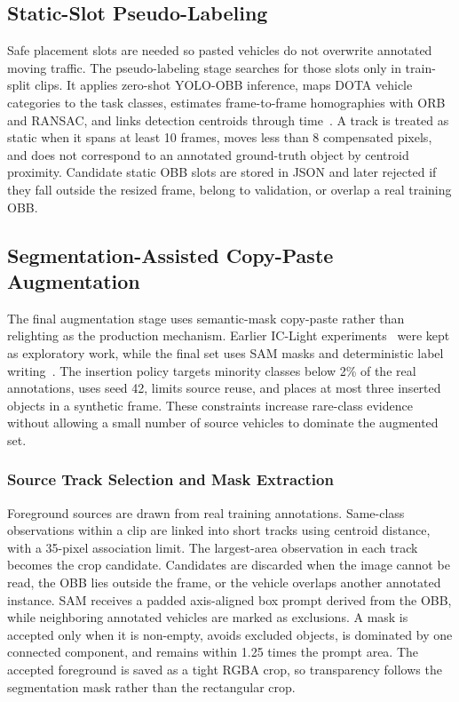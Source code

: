 \subsection{Static-Slot Pseudo-Labeling}
\label{sec:static_slot_pseudo_labeling}

Safe placement slots are needed so pasted vehicles do not overwrite annotated moving traffic. The pseudo-labeling stage searches for those slots only in train-split clips. It applies zero-shot YOLO-OBB inference, maps DOTA vehicle categories to the task classes, estimates frame-to-frame homographies with ORB and RANSAC, and links detection centroids through time~\cite{Rublee2011ORB,Fischler1981RANSAC,Hartley2004MVG}. A track is treated as static when it spans at least 10 frames, moves less than 8 compensated pixels, and does not correspond to an annotated ground-truth object by centroid proximity. Candidate static OBB slots are stored in JSON and later rejected if they fall outside the resized frame, belong to validation, or overlap a real training OBB.

\subsection{Segmentation-Assisted Copy-Paste Augmentation}
\label{sec:data_augmentation}

The final augmentation stage uses semantic-mask copy-paste rather than relighting as the production mechanism. Earlier IC-Light experiments~\cite{Zhang2025ICLight} were kept as exploratory work, while the final set uses SAM masks and deterministic label writing~\cite{Kirillov2023SAM}. The insertion policy targets minority classes below 2\% of the real annotations, uses seed 42, limits source reuse, and places at most three inserted objects in a synthetic frame. These constraints increase rare-class evidence without allowing a small number of source vehicles to dominate the augmented set.

\subsubsection{Source Track Selection and Mask Extraction}
\label{sec:mask_extraction}

Foreground sources are drawn from real training annotations. Same-class observations within a clip are linked into short tracks using centroid distance, with a 35-pixel association limit. The largest-area observation in each track becomes the crop candidate. Candidates are discarded when the image cannot be read, the OBB lies outside the frame, or the vehicle overlaps another annotated instance. SAM receives a padded axis-aligned box prompt derived from the OBB, while neighboring annotated vehicles are marked as exclusions. A mask is accepted only when it is non-empty, avoids excluded objects, is dominated by one connected component, and remains within 1.25 times the prompt area. The accepted foreground is saved as a tight RGBA crop, so transparency follows the segmentation mask rather than the rectangular crop.


